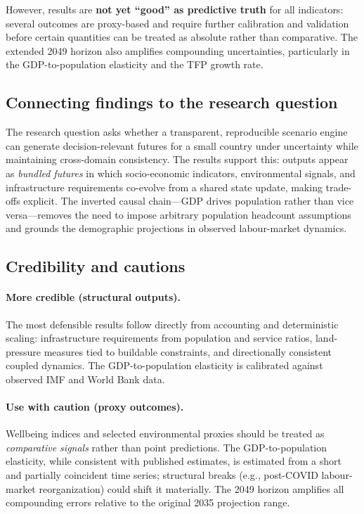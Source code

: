 \documentclass{article}
\begin{document}
However, results are \textbf{not yet ``good'' as predictive truth} for all
indicators: several outcomes are proxy-based and require further calibration and
validation before certain quantities can be treated as absolute rather than
comparative. The extended 2049 horizon also amplifies compounding uncertainties,
particularly in the GDP-to-population elasticity and the TFP growth rate.

\subsection{Connecting findings to the research question}

The research question asks whether a transparent, reproducible scenario engine
can generate decision-relevant futures for a small country under uncertainty
while maintaining cross-domain consistency. The results support this: outputs
appear as \emph{bundled futures} in which socio-economic indicators,
environmental signals, and infrastructure requirements co-evolve from a shared
state update, making trade-offs explicit. The inverted causal chain---GDP drives
population rather than vice versa---removes the need to impose arbitrary
population headcount assumptions and grounds the demographic projections in
observed labour-market dynamics.

\subsection{Credibility and cautions}

\paragraph{More credible (structural outputs).}
The most defensible results follow directly from accounting and deterministic
scaling: infrastructure requirements from population and service ratios,
land-pressure measures tied to buildable constraints, and directionally
consistent coupled dynamics. The GDP-to-population elasticity is calibrated
against observed IMF and World Bank data.

\paragraph{Use with caution (proxy outcomes).}
Wellbeing indices and selected environmental proxies should be treated as
\emph{comparative signals} rather than point predictions. The GDP-to-population
elasticity, while consistent with published estimates, is estimated from a short
and partially coincident time series; structural breaks (e.g., post-COVID
labour-market reorganization) could shift it materially. The 2049 horizon
amplifies all compounding errors relative to the original 2035 projection range.
\end{document}
